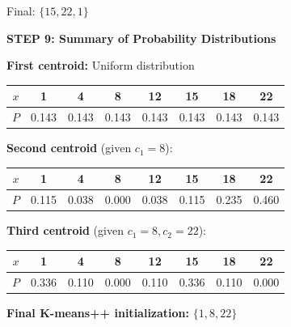 \documentclass[12pt]{article}
\begin{document}
\begin{solution}
Final: $\{15, 22, 1\}$

\textbf{STEP 9: Summary of Probability Distributions}

\textbf{First centroid:} Uniform distribution

\begin{center}
\begin{tabular}{c|c|c|c|c|c|c|c}
$x$ & 1 & 4 & 8 & 12 & 15 & 18 & 22 \\
\hline
$P$ & 0.143 & 0.143 & 0.143 & 0.143 & 0.143 & 0.143 & 0.143 \\
\end{tabular}
\end{center}

\textbf{Second centroid} (given $c_1=8$):

\begin{center}
\begin{tabular}{c|c|c|c|c|c|c|c}
$x$ & 1 & 4 & 8 & 12 & 15 & 18 & 22 \\
\hline
$P$ & 0.115 & 0.038 & 0.000 & 0.038 & 0.115 & 0.235 & 0.460 \\
\end{tabular}
\end{center}

\textbf{Third centroid} (given $c_1=8, c_2=22$):

\begin{center}
\begin{tabular}{c|c|c|c|c|c|c|c}
$x$ & 1 & 4 & 8 & 12 & 15 & 18 & 22 \\
\hline
$P$ & 0.336 & 0.110 & 0.000 & 0.110 & 0.336 & 0.110 & 0.000 \\
\end{tabular}
\end{center}

\textbf{Final K-means++ initialization:} $\boxed{\{1, 8, 22\}}$

\end{solution}
\end{document}
